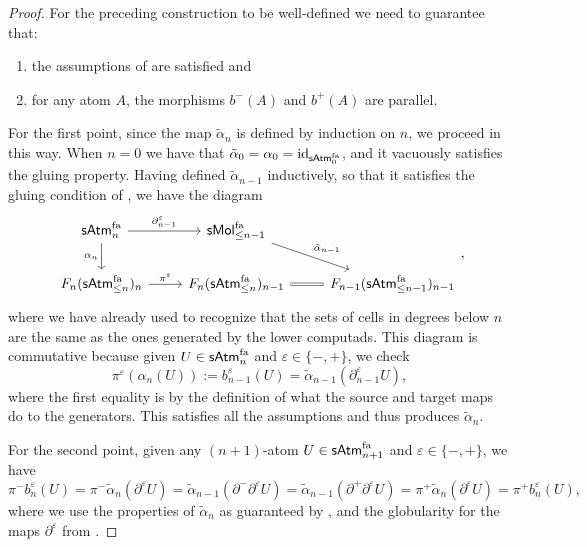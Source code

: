 \documentclass[12pt,a4paper]{article}
\numberwithin{equation}{section}
\newcommand{\atm}[2][s]{%
    \ifx b#1\mathsf{Atm}_{#2}\else
    \ifx s#1\mathsf{sAtm}_{#2}\else
    \ifx f#1\mathsf{sAtm}^{\mathrm{fa}}_{#2}\else
    \mathrm{Illegal~option}%
    \fi\fi\fi
}
\newcommand{\mol}[2][s]{%
    \ifx b#1\mathsf{Mol}_{#2}\else
    \ifx s#1\mathsf{sMol}_{#2}\else
    \ifx f#1\mathsf{sMol}^{\mathrm{fa}}_{#2}\else
    \mathrm{Illegal~option}%
    \fi\fi\fi
}
\begin{document}
\begin{proof}
    For the preceding construction to be well-defined we need to guarantee that:
    \begin{enumerate}
        \item the assumptions of  are satisfied and
        \item for any atom $A$, the morphisms $b^-(A)$ and $b^+(A)$ are parallel.
    \end{enumerate}

    For the first point, since the map $\tilde{\alpha}_{n}$ is defined by induction on $n$, we proceed in this way. When $n=0$ we have that $\tilde{\alpha}_0 = \alpha_0 = \mathrm{id}_{\atm[f]{0}}$, and it vacuously satisfies the gluing property. Having defined $\tilde{\alpha}_{n-1}$ inductively, so that it satisfies the gluing condition of , we have the diagram
    \begin{equation}
        \begin{tikzcd}
            \atm[f]{n} \arrow[r, "\partial^\varepsilon_{n-1}"] \arrow[d, "\alpha_n"'] & \mol[f]{\leq n - 1} \arrow[rd, "\tilde{\alpha}_{n-1}"] \\
            F_n (\atm[f]{\leq n})_n \arrow[r, "\pi^\varepsilon"] & F_n (\atm[f]{\leq n})_{n-1} \arrow[r, Rightarrow, no head] & F_{n-1} (\atm[f]{\leq n-1})_{n-1}
        \end{tikzcd},
    \end{equation}
    where we have already used  to recognize that the sets of cells in degrees below $n$ are the same as the ones generated by the lower computads. This diagram is commutative because given $U \in \atm[f]{n}$ and $\varepsilon \in \{-,+\}$, we check
    \begin{equation}
        \pi^{\varepsilon} (\alpha_n (U)) := b^{\varepsilon}_{n-1} (U) = \tilde{\alpha}_{n-1} (\partial^{\varepsilon}_{n-1} U),
    \end{equation}
    where the first equality is by the definition of what the source and target maps do to the generators. This satisfies all the assumptions and thus produces $\tilde{\alpha}_n$.

    For the second point, given any $(n+1)$-atom $U \in \atm[f]{n+1}$ and $\varepsilon \in \{-,+\}$, we have
    \begin{equation}
        \pi^- b^{\varepsilon}_n (U) = \pi^- \tilde{\alpha}_n (\partial^{\varepsilon} U) = \tilde{\alpha}_{n-1} (\partial^- \partial^{\varepsilon} U) = \tilde{\alpha}_{n-1} (\partial^+ \partial^{\varepsilon} U) = \pi^+ \tilde{\alpha}_n (\partial^{\varepsilon} U) = \pi^+ b^{\varepsilon}_n (U),
    \end{equation}
    where we use the properties of $\tilde{\alpha}_n$ as guaranteed by , and the globularity for the maps $\partial^{\varepsilon}$ from .
\end{proof}
\end{document}

